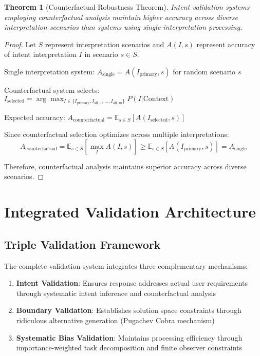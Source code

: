 \documentclass[12pt,a4paper]{article}
\newtheorem{theorem}{Theorem}
\begin{document}
\begin{theorem}[Counterfactual Robustness Theorem]
Intent validation systems employing counterfactual analysis maintain higher accuracy across diverse interpretation scenarios than systems using single-interpretation processing.
\end{theorem}

\begin{proof}
Let $S$ represent interpretation scenarios and $A(I, s)$ represent accuracy of intent interpretation $I$ in scenario $s \in S$.

Single interpretation system: $A_{\text{single}} = A(I_{\text{primary}}, s)$ for random scenario $s$

Counterfactual system selects: $I_{\text{selected}} = \arg\max_{I \in \{I_{\text{primary}}, I_{\text{alt},1}, ..., I_{\text{alt},m}\}} P(I | \text{Context})$

Expected accuracy: $A_{\text{counterfactual}} = \mathbb{E}_{s \in S}[A(I_{\text{selected}}, s)]$

Since counterfactual selection optimizes across multiple interpretations:
$$A_{\text{counterfactual}} = \mathbb{E}_{s \in S}[\max_{I} A(I, s)] \geq \mathbb{E}_{s \in S}[A(I_{\text{primary}}, s)] = A_{\text{single}}$$

Therefore, counterfactual analysis maintains superior accuracy across diverse scenarios.
\end{proof}

\section{Integrated Validation Architecture}

\subsection{Triple Validation Framework}

The complete validation system integrates three complementary mechanisms:

\begin{enumerate}
\item \textbf{Intent Validation}: Ensures response addresses actual user requirements through systematic intent inference and counterfactual analysis
\item \textbf{Boundary Validation}: Establishes solution space constraints through ridiculous alternative generation (Pugachev Cobra mechanism)  
\item \textbf{Systematic Bias Validation}: Maintains processing efficiency through importance-weighted task decomposition and finite observer constraints
\end{enumerate}
\end{document}
